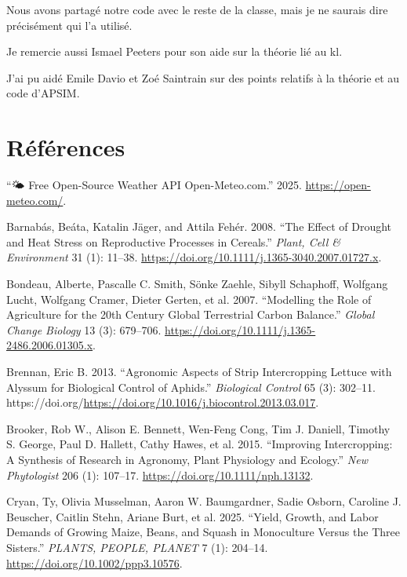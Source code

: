 \documentclass[
]{article}
\newlength{\cslhangindent}
\newenvironment{CSLReferences}[2] %
 {\begin{list}{}{%
  \setlength{\itemindent}{0pt}
  \setlength{\leftmargin}{0pt}
  \setlength{\parsep}{0pt}
  \ifodd #1
   \setlength{\leftmargin}{\cslhangindent}
   \setlength{\itemindent}{-1\cslhangindent}
  \fi
  \setlength{\itemsep}{#2\baselineskip}}}
 {\end{list}}
\begin{document}
Nous avons partagé notre code avec le reste de la classe, mais je ne
saurais dire précisément qui l'a utilisé.

Je remercie aussi Ismael Peeters pour son aide sur la théorie lié au kl.

J'ai pu aidé Emile Davio et Zoé Saintrain sur des points relatifs à la
théorie et au code d'APSIM.

\newpage

\section*{Références}\label{ruxe9fuxe9rences}

\label{refs}
\begin{CSLReferences}{1}{0}
{``🌤️ {Free} {Open}-{Source} {Weather} {API} {\textbar}
{Open}-{Meteo}.com.''} 2025. \url{https://open-meteo.com/}.

Barnabás, Beáta, Katalin Jäger, and Attila Fehér. 2008. {``The Effect of
Drought and Heat Stress on Reproductive Processes in Cereals.''}
\emph{Plant, Cell \& Environment} 31 (1): 11--38.
\url{https://doi.org/10.1111/j.1365-3040.2007.01727.x}.

Bondeau, Alberte, Pascalle C. Smith, Sönke Zaehle, Sibyll Schaphoff,
Wolfgang Lucht, Wolfgang Cramer, Dieter Gerten, et al. 2007.
{``Modelling the Role of Agriculture for the 20th Century Global
Terrestrial Carbon Balance.''} \emph{Global Change Biology} 13 (3):
679--706. \url{https://doi.org/10.1111/j.1365-2486.2006.01305.x}.

Brennan, Eric B. 2013. {``Agronomic Aspects of Strip Intercropping
Lettuce with Alyssum for Biological Control of Aphids.''}
\emph{Biological Control} 65 (3): 302--11.
https://doi.org/\url{https://doi.org/10.1016/j.biocontrol.2013.03.017}.

Brooker, Rob W., Alison E. Bennett, Wen-Feng Cong, Tim J. Daniell,
Timothy S. George, Paul D. Hallett, Cathy Hawes, et al. 2015.
{``Improving Intercropping: A Synthesis of Research in Agronomy, Plant
Physiology and Ecology.''} \emph{New Phytologist} 206 (1): 107--17.
\url{https://doi.org/10.1111/nph.13132}.

Cryan, Ty, Olivia Musselman, Aaron W. Baumgardner, Sadie Osborn,
Caroline J. Beuscher, Caitlin Stehn, Ariane Burt, et al. 2025. {``Yield,
Growth, and Labor Demands of Growing Maize, Beans, and Squash in
Monoculture Versus the {Three} {Sisters}.''} \emph{PLANTS, PEOPLE,
PLANET} 7 (1): 204--14. \url{https://doi.org/10.1002/ppp3.10576}.


\end{CSLReferences}
\end{document}
